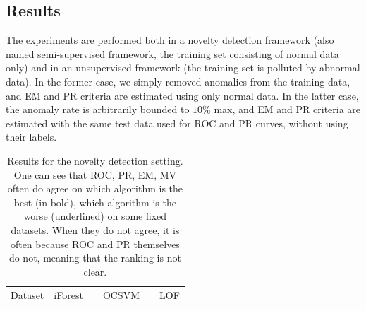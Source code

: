 \subsection{Results}

The experiments are performed both in a novelty detection framework (also named semi-supervised framework, the training set consisting of normal data only) and in an unsupervised framework (the training set is polluted by abnormal data).
In the former case, we simply removed anomalies from the training data, and EM and PR criteria are estimated using only normal data.
In the latter case, the anomaly rate is arbitrarily bounded to $10\%$ max, and EM and PR criteria are estimated with the same test data used for ROC and PR curves, without using their labels.

\begin{table}[!ht]
\centering
\caption{Results for the novelty detection setting. One can see that ROC, PR, EM, MV often do agree on which algorithm is the best (in bold), which algorithm is the worse (underlined) on some fixed datasets. When they do not agree, it is often because ROC and PR themselves do not, meaning that the ranking is not clear.}
\label{evaluation:table:results-semisupervised}
\footnotesize
\tabcolsep=0.11cm
\resizebox{\linewidth}{!} {
\begin{tabular}{l cccc c cccc c cccc}
\toprule
Dataset      & \multicolumn{4}{c}{iForest}& & \multicolumn{4}{c}{OCSVM}&  & \multicolumn{4}{c}{LOF} \\ %
  \cmidrule{1-15}


\end{tabular}}
\end{table}
